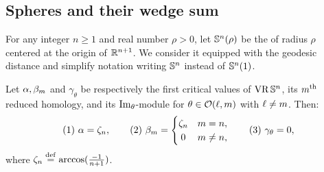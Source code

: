 
\subsection{Spheres and their wedge sum }\label{ss:Sn}\label{subsub:critical values of Sn}

For any integer $n \geq 1$ and real number $\rho > 0$, let $\mathbb{S}^n(\rho)$ be the  of radius $\rho$ centered at the origin of $\mathbb{R}^{n+1}$.
We consider it equipped with the geodesic distance and simplify notation writing \(\mathbb{S}^n\) instead of \(\mathbb{S}^n(1)\).


\medskip\proposition
Let $\alpha, \beta_m$ and $\gamma_\theta$ be respectively the first critical values of $\operatorname{VR}\mathbb{S}^n$, its $m^{\mathrm{th}}$ reduced homology, and its $\operatorname{Im}_\theta$-module for \(\theta \in \mathcal{O}(\ell,m)\) with \(\ell \neq m\).
Then:
\[
\mathrm{(1)}\ \alpha = \zeta_n,
\qquad
\mathrm{(2)}\ \beta_m =
\begin{cases}
	\zeta_n & m = n, \\
	\hfil 0 & m \neq n,
\end{cases}
\qquad
\mathrm{(3)}\ \gamma_\theta = 0,
\]
where \(\zeta_n \stackrel{\mathrm{def}}{=} \arccos(\tfrac{-1}{n+1})\).

